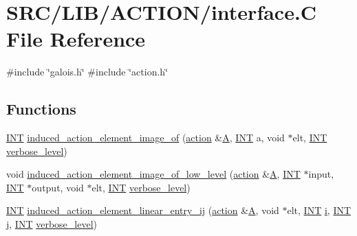 \hypertarget{interface_8_c}{}\section{S\+R\+C/\+L\+I\+B/\+A\+C\+T\+I\+O\+N/interface.C File Reference}
\label{interface_8_c}
{\ttfamily \#include \char`\"{}galois.\+h\char`\"{}}\newline
{\ttfamily \#include \char`\"{}action.\+h\char`\"{}}\newline
\subsection*{Functions}
\begin{DoxyCompactItemize}
\item 
\mbox{\hyperlink{galois_8h_a09fddde158a3a20bd2dcadb609de11dc}{I\+NT}} \mbox{\hyperlink{interface_8_c_a821850d6c3988dd122de0489cd36f0f0}{induced\+\_\+action\+\_\+element\+\_\+image\+\_\+of}} (\mbox{\hyperlink{classaction}{action}} \&\mbox{\hyperlink{simeon_8_c_a97833f04c3a9c008df5521a2fc291bb4}{A}}, \mbox{\hyperlink{galois_8h_a09fddde158a3a20bd2dcadb609de11dc}{I\+NT}} a, void $\ast$elt, \mbox{\hyperlink{galois_8h_a09fddde158a3a20bd2dcadb609de11dc}{I\+NT}} \mbox{\hyperlink{simeon_8_c_a818073fbcc2f439e7c56952f67386122}{verbose\+\_\+level}})
\item 
void \mbox{\hyperlink{interface_8_c_aa4bc5f68829829d9a41223c260c658c5}{induced\+\_\+action\+\_\+element\+\_\+image\+\_\+of\+\_\+low\+\_\+level}} (\mbox{\hyperlink{classaction}{action}} \&\mbox{\hyperlink{simeon_8_c_a97833f04c3a9c008df5521a2fc291bb4}{A}}, \mbox{\hyperlink{galois_8h_a09fddde158a3a20bd2dcadb609de11dc}{I\+NT}} $\ast$input, \mbox{\hyperlink{galois_8h_a09fddde158a3a20bd2dcadb609de11dc}{I\+NT}} $\ast$output, void $\ast$elt, \mbox{\hyperlink{galois_8h_a09fddde158a3a20bd2dcadb609de11dc}{I\+NT}} \mbox{\hyperlink{simeon_8_c_a818073fbcc2f439e7c56952f67386122}{verbose\+\_\+level}})
\item 
\mbox{\hyperlink{galois_8h_a09fddde158a3a20bd2dcadb609de11dc}{I\+NT}} \mbox{\hyperlink{interface_8_c_a47c7bc13ff83642f146b13216a9755a0}{induced\+\_\+action\+\_\+element\+\_\+linear\+\_\+entry\+\_\+ij}} (\mbox{\hyperlink{classaction}{action}} \&\mbox{\hyperlink{simeon_8_c_a97833f04c3a9c008df5521a2fc291bb4}{A}}, void $\ast$elt, \mbox{\hyperlink{galois_8h_a09fddde158a3a20bd2dcadb609de11dc}{I\+NT}} \mbox{\hyperlink{alphabet2_8_c_acb559820d9ca11295b4500f179ef6392}{i}}, \mbox{\hyperlink{galois_8h_a09fddde158a3a20bd2dcadb609de11dc}{I\+NT}} \mbox{\hyperlink{alphabet2_8_c_a37d972ae0b47b9099e30983131d31916}{j}}, \mbox{\hyperlink{galois_8h_a09fddde158a3a20bd2dcadb609de11dc}{I\+NT}} \mbox{\hyperlink{simeon_8_c_a818073fbcc2f439e7c56952f67386122}{verbose\+\_\+level}})

\end{DoxyCompactItemize}
